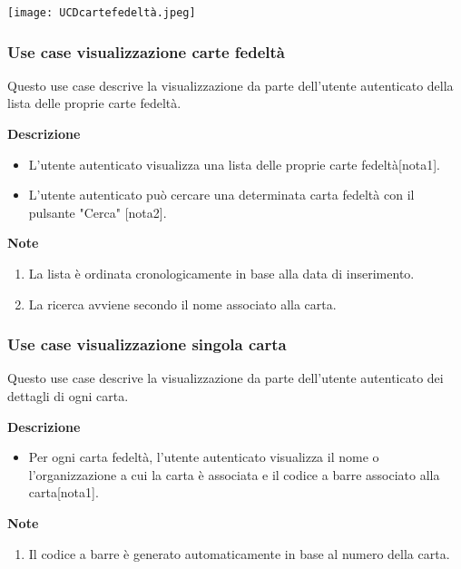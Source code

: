 \documentclass[a4paper,12pt]{article}
\begin{document}
\begin{center}
  \texttt{[image: UCDcartefedeltà.jpeg]}
\end{center}

\subsubsection*{Use case visualizzazione carte fedeltà}

Questo use case descrive la visualizzazione da parte dell'utente autenticato della lista delle proprie carte fedeltà.

\textbf{Descrizione}
\begin{itemize} \setlength\itemsep{0.01em}
\item L'utente autenticato visualizza una lista delle proprie carte fedeltà[nota1].
\item L'utente autenticato può cercare una determinata carta fedeltà con il pulsante "Cerca" [nota2].
\end{itemize}

\textbf{Note}
\begin{enumerate} \setlength\itemsep{0.01em}
\item La lista è ordinata cronologicamente in base alla data di inserimento.
\item La ricerca avviene secondo il nome associato alla carta.
\end{enumerate}




\subsubsection*{Use case visualizzazione singola carta}

Questo use case descrive la visualizzazione da parte dell'utente autenticato dei dettagli di ogni carta.

\textbf{Descrizione}
\begin{itemize} \setlength\itemsep{0.01em}
\item Per ogni carta fedeltà, l'utente autenticato visualizza il nome o l'organizzazione a cui la carta è associata e il codice a barre associato alla carta[nota1].
\end{itemize}

\textbf{Note}
\begin{enumerate} \setlength\itemsep{0.01em}
\item Il codice a barre è generato automaticamente in base al numero della carta.
\end{enumerate}
\end{document}
